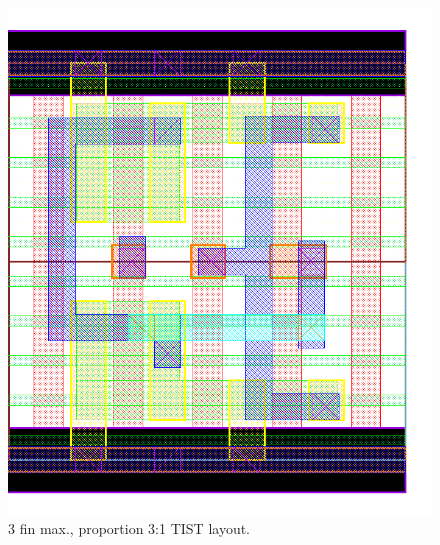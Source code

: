\documentclass[pgmicro,mestrado,english]{iiufrgs}
\begin{document}
\begin{figure}[H]
\centering
\includegraphics[width=\textwidth,height=\textheight,keepaspectratio]{TIST3F1F.png}
\caption{3 fin max., proportion 3:1 TIST layout.}
\label{fig:TIST2F}
\end{figure}
\end{document}
